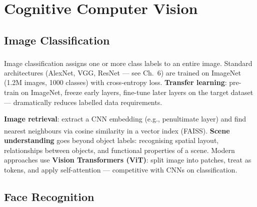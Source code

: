 \section{Cognitive Computer Vision}

\subsection{Image Classification}

\begin{tcbitemize}[ skin=sectionraster ]
    \tcbitem[title={CNN Classifiers and Transfer Learning}, raster multicolumn=3]
    Image classification assigns one or more class labels to an entire image\textsuperscript{\cite[][p.~104]{fleuretLittleBookDeep}}.
    Standard architectures (AlexNet, VGG, ResNet --- see Ch.~6) are trained on ImageNet (1.2M images, 1000 classes) with cross-entropy loss.
    \textbf{Transfer learning}: pre-train on ImageNet, freeze early layers, fine-tune later layers on the target dataset --- dramatically reduces labelled data requirements.

    \tcbitem[title={Image Retrieval and Scene Understanding}, raster multicolumn=3]
    \textbf{Image retrieval}: extract a CNN embedding (e.g., penultimate layer) and find nearest neighbours via cosine similarity in a vector index (FAISS)\textsuperscript{\cite[][p.~104]{fleuretLittleBookDeep}}.
    \textbf{Scene understanding} goes beyond object labels: recognising spatial layout, relationships between objects, and functional properties of a scene.
    Modern approaches use \textbf{Vision Transformers (ViT)}: split image into patches, treat as tokens, and apply self-attention --- competitive with CNNs on classification.
\end{tcbitemize}

\subsection{Face Recognition}

